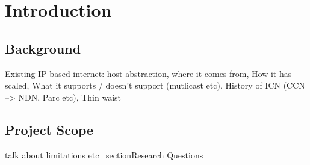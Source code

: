 \chapter{Introduction}
\cite{nfd-dev-guide}
\section{Background}
Existing IP based internet: host abstraction, where it comes from, How it has scaled, What it supports / doesn't support (mutlicast etc), History of ICN (CCN --> NDN, Parc etc), Thin waist

\section{Project Scope}
talk about limitations etc
\
section{Research Questions}